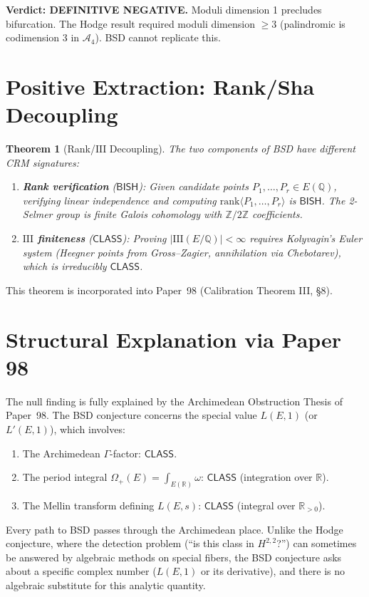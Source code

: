 \documentclass[11pt,a4paper]{article}
\theoremstyle{plain}
\newtheorem{theorem}{Theorem}
\theoremstyle{definition}
\newcommand{\BISH}{\textsf{BISH}}
\newcommand{\CLASS}{\textsf{CLASS}}
\newcommand{\Q}{\mathbb{Q}}
\newcommand{\Z}{\mathbb{Z}}
\newcommand{\Sha}{\mathrm{III}}
\newcommand{\rank}{\mathrm{rank}}
\begin{document}
\textbf{Verdict: DEFINITIVE NEGATIVE.} Moduli dimension 1 precludes bifurcation. The Hodge result required moduli dimension $\geq 3$ (palindromic is codimension 3 in $\mathcal{A}_4$). BSD cannot replicate this.

\section{Positive Extraction: Rank/Sha Decoupling}

\begin{theorem}[Rank/$\Sha$ Decoupling]
The two components of BSD have different CRM signatures:
\begin{enumerate}
\item[(i)] \textbf{Rank verification} ($\BISH$): Given candidate points $P_1, \ldots, P_r \in E(\Q)$, verifying linear independence and computing $\rank\langle P_1, \ldots, P_r \rangle$ is $\BISH$. The 2-Selmer group is finite Galois cohomology with $\Z/2\Z$ coefficients.
\item[(ii)] \textbf{$\Sha$ finiteness} ($\CLASS$): Proving $|\Sha(E/\Q)| < \infty$ requires Kolyvagin's Euler system (Heegner points from Gross--Zagier, annihilation via Chebotarev), which is irreducibly $\CLASS$.
\end{enumerate}
\end{theorem}

This theorem is incorporated into Paper~98 (Calibration Theorem III, \S8).

\section{Structural Explanation via Paper 98}

The null finding is fully explained by the Archimedean Obstruction Thesis of Paper~98. The BSD conjecture concerns the special value $L(E, 1)$ (or $L'(E, 1)$), which involves:

\begin{enumerate}
\item[(a)] The Archimedean $\Gamma$-factor: $\CLASS$.
\item[(b)] The period integral $\Omega_+(E) = \int_{E(\mathbb{R})} \omega$: $\CLASS$ (integration over $\mathbb{R}$).
\item[(c)] The Mellin transform defining $L(E, s)$: $\CLASS$ (integral over $\mathbb{R}_{>0}$).
\end{enumerate}

Every path to BSD passes through the Archimedean place. Unlike the Hodge conjecture, where the detection problem (``is this class in $H^{2,2}$?'') can sometimes be answered by algebraic methods on special fibers, the BSD conjecture asks about a specific complex number ($L(E,1)$ or its derivative), and there is no algebraic substitute for this analytic quantity.
\end{document}
